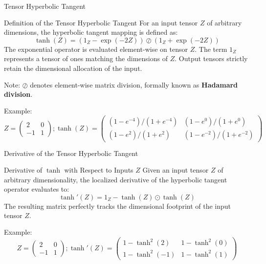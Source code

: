\begin{frame}{Tensor Hyperbolic Tangent}
	\begin{block}{Definition of the Tensor Hyperbolic Tangent}
		For an input tensor $Z$ of arbitrary dimensions, the hyperbolic tangent mapping is defined as:
		\begin{equation*}
			\tanh(Z) = \left(1_Z - \exp{(-2 Z)}\right) \oslash \left(1_Z + \exp{(-2 Z)}\right)
		\end{equation*}
		The exponential operator is evaluated element-wise on tensor $Z$. The term $1_Z$ represents a tensor of ones matching the dimensions of $Z$. Output tensors strictly retain the dimensional allocation of the input.
	\end{block}
	Note: $\oslash$ denotes element-wise matrix division, formally known as \textbf{Hadamard division}.
	
	Example:
	\begin{equation*}
		Z = \begin{pmatrix}
			2 & 0 \\
			-1 & 1 
		\end{pmatrix}; 
		\tanh(Z) = \begin{pmatrix}
			(1 - e^{-4}) / (1 + e^{-4}) & (1 - e^{0}) / (1 + e^{0}) \\
			(1 - e^{2}) / (1 + e^{2}) & (1 - e^{-2}) / (1 + e^{-2})
		\end{pmatrix}
	\end{equation*}	
\end{frame}

\begin{frame}{Derivative of the Tensor Hyperbolic Tangent}
	
	\begin{block}{Derivative of $\tanh$ with Respect to Inputs $Z$}
		Given an input tensor $Z$ of arbitrary dimensionality, the localized derivative of the hyperbolic tangent operator evaluates to:
		\begin{equation*}
			\tanh'(Z) = 1_Z - \tanh{(Z)} \odot \tanh{(Z)}
		\end{equation*}
		The resulting matrix perfectly tracks the dimensional footprint of the input tensor $Z$.		
	\end{block}
	Example:
	\begin{equation*}
		Z = \begin{pmatrix}
			2 & 0 \\
			-1 & 1 
		\end{pmatrix}; 
		\tanh'(Z) = \begin{pmatrix}
			1 - \tanh^2{(2)}  & 1 - \tanh^2{(0)} \\
			1 - \tanh^2{(-1)} & 1 - \tanh^2{(1)}
		\end{pmatrix}
	\end{equation*}	
\end{frame}

